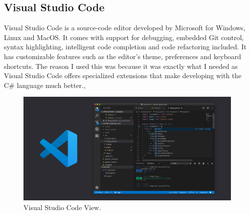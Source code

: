\subsection{Visual Studio Code}
Visual Studio Code is a source-code editor developed by Microsoft for Windows, Linux and MacOS. It comes with support for debugging, embedded Git control, syntax highlighting, intelligent code completion and code refactoring included. It has customizable features such as the editor's theme, preferences and keyboard shortcuts. The reason I used this was because it was exactly what I needed as Visual Studio Code offers specialized extensions that make developing with the C\# language much better.\cite{VSCode}, 
\begin{figure}[h]
  \includegraphics[width=\linewidth]{Images/VSCode.png}
  \caption{Visual Studio Code View.}
  \label{fig:VSCode}
\end{figure}